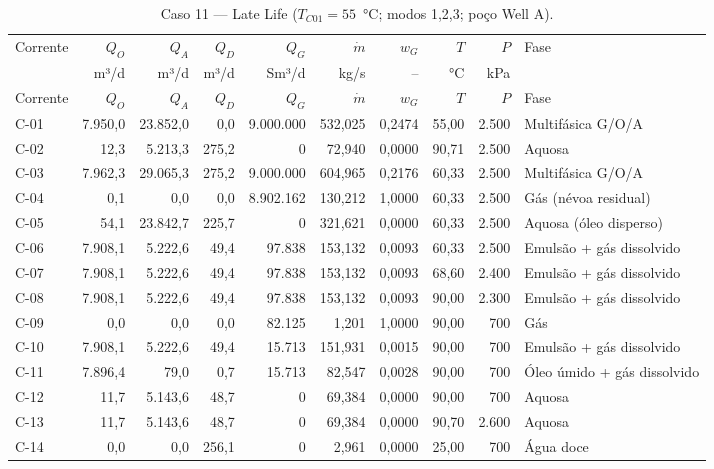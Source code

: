 \documentclass[11pt,a4paper]{article}
\numberwithin{equation}{section}
\numberwithin{table}{section}
\numberwithin{figure}{section}
\begin{document}
{\footnotesize\setlength{\tabcolsep}{3pt}\begin{longtable}{lrrrrrrrrL{2.5cm}}
\caption{Caso 11 --- Late Life ($T_{C01}=55$~°C; modos 1,2,3; poço Well A).}\\\toprule
Corrente & $Q_O$ & $Q_A$ & $Q_D$ & $Q_G$ & $\dot m$ & $w_G$ & $T$ & $P$ & Fase\\ & m³/d & m³/d & m³/d & Sm³/d & kg/s & -- & °C & kPa & \\\midrule\endfirsthead
\toprule Corrente & $Q_O$ & $Q_A$ & $Q_D$ & $Q_G$ & $\dot m$ & $w_G$ & $T$ & $P$ & Fase\\\midrule\endhead
C-01 & 7.950,0 & 23.852,0 & 0,0 & 9.000.000 & 532,025 & 0,2474 & 55,00 & 2.500 & {\scriptsize Multifásica G/O/A}\\
C-02 & 12,3 & 5.213,3 & 275,2 & 0 & 72,940 & 0,0000 & 90,71 & 2.500 & {\scriptsize Aquosa}\\
C-03 & 7.962,3 & 29.065,3 & 275,2 & 9.000.000 & 604,965 & 0,2176 & 60,33 & 2.500 & {\scriptsize Multifásica G/O/A}\\
C-04 & 0,1 & 0,0 & 0,0 & 8.902.162 & 130,212 & 1,0000 & 60,33 & 2.500 & {\scriptsize Gás (névoa residual)}\\
C-05 & 54,1 & 23.842,7 & 225,7 & 0 & 321,621 & 0,0000 & 60,33 & 2.500 & {\scriptsize Aquosa (óleo disperso)}\\
C-06 & 7.908,1 & 5.222,6 & 49,4 & 97.838 & 153,132 & 0,0093 & 60,33 & 2.500 & {\scriptsize Emulsão + gás dissolvido}\\
C-07 & 7.908,1 & 5.222,6 & 49,4 & 97.838 & 153,132 & 0,0093 & 68,60 & 2.400 & {\scriptsize Emulsão + gás dissolvido}\\
C-08 & 7.908,1 & 5.222,6 & 49,4 & 97.838 & 153,132 & 0,0093 & 90,00 & 2.300 & {\scriptsize Emulsão + gás dissolvido}\\
C-09 & 0,0 & 0,0 & 0,0 & 82.125 & 1,201 & 1,0000 & 90,00 & 700 & {\scriptsize Gás}\\
C-10 & 7.908,1 & 5.222,6 & 49,4 & 15.713 & 151,931 & 0,0015 & 90,00 & 700 & {\scriptsize Emulsão + gás dissolvido}\\
C-11 & 7.896,4 & 79,0 & 0,7 & 15.713 & 82,547 & 0,0028 & 90,00 & 700 & {\scriptsize Óleo úmido + gás dissolvido}\\
C-12 & 11,7 & 5.143,6 & 48,7 & 0 & 69,384 & 0,0000 & 90,00 & 700 & {\scriptsize Aquosa}\\
C-13 & 11,7 & 5.143,6 & 48,7 & 0 & 69,384 & 0,0000 & 90,70 & 2.600 & {\scriptsize Aquosa}\\
C-14 & 0,0 & 0,0 & 256,1 & 0 & 2,961 & 0,0000 & 25,00 & 700 & {\scriptsize Água doce}\\

\end{longtable}}
\end{document}
